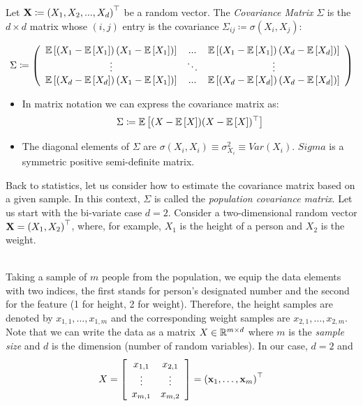 \begin{definition}
Let $ \mathbf{X} \coloneqq\left(X_{1},X_{2},...,X_d\right)^\top$ be a random vector. The  {\em Covariance Matrix} $\Sigma$ is the $d \times d$ matrix whose $\left(i,j\right)$ entry is the covariance $\Sigma_{ij}\coloneqq\sigma\left(X_i,X_j\right)$:

$$\Sigma\coloneqq\left(\begin{array}{ccc}
	\mathbb{E}\left[\left(X_{1}-\mathbb{E}\left[X_{1}\right]\right)\left(X_{1}-\mathbb{E}\left[X_{1}\right]\right)\right] & ... & \mathbb{E}\left[\left(X_{1}-\mathbb{E}\left[X_{1}\right]\right)\left(X_{d}-\mathbb{E}\left[X_{d}\right]\right)\right]\\
	\vdots & \ddots & \vdots\\
	\mathbb{E}\left[\left(X_{d}-\mathbb{E}\left[X_{d}\right]\right)\left(X_{1}-\mathbb{E}\left[X_{1}\right]\right)\right] & ... & \mathbb{E}\left[\left(X_{d}-\mathbb{E}\left[X_{d}\right]\right)\left(X_{d}-\mathbb{E}\left[X_{d}\right]\right)\right]
\end{array}\right)$$

\begin{itemize}
\item In matrix notation we can express the covariance matrix as: $$\Sigma\coloneqq\mathbb{E}\left[(X - {\mathbb{E}\left[X\right]} )({X} -{\mathbb{E}\left[X\right]} )^\top\right]$$
\item The diagonal elements of $\Sigma$ are $\sigma\left(X_i, X_i\right) \equiv \sigma^2 _{X_i} \equiv  Var\left(X_i\right)$. $Sigma$ is a symmetric positive semi-definite matrix.
\end{itemize}
\end{definition}


Back to statistics, let us consider how to estimate the covariance matrix based on a given sample. In this context, $\Sigma$ is called the {\em population covariance matrix}.
Let us start with the bi-variate case $d=2$. Consider a two-dimensional random vector $\mathbf{X}=\left(X_1,X_2\right)^\top$, where, for example, $X_1$ is the height of a person and $X_2$ is the weight.

~\\Taking a sample of $m$ people from the population, we equip the data elements with two indices, the first stands for person's designated number and the second for the feature (1 for height, 2 for weight). Therefore, the height samples are denoted by  $x_{1,1},\ldots,x_{1,m}$ and the corresponding weight samples are $x_{2,1},\ldots,x_{2,m}$. Note that we can write the data as a matrix $X\in\mathbb{R}^{m \times d}$ where $m$ is the {\em sample size} and $d$ is the dimension (number of random variables). In our case, $d=2$ and
$$X = 
\left[\begin{array}{cc}
x_{1,1} &  x_{2,1} \\
\vdots & \vdots \\
x_{m,1} & x_{m,2}
\end{array}\right] = \left(\mathbf{x}_1,\ldots,\mathbf{x}_m\right)^\top
$$


